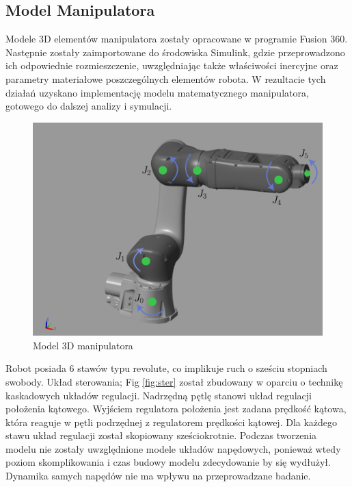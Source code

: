 \documentclass[journal,twoside,web]{ieeecolor}
\begin{document}
\subsection{Model Manipulatora}
Modele 3D elementów manipulatora zostały opracowane w programie Fusion 360. Następnie zostały zaimportowane do środowiska Simulink, gdzie przeprowadzono ich odpowiednie rozmieszczenie, uwzględniając także właściwości inercyjne oraz parametry materiałowe poszczególnych elementów robota. W rezultacie tych działań uzyskano implementację modelu matematycznego manipulatora, gotowego do dalszej analizy i symulacji. 
\begin{figure}[H]
	\centering
	\includegraphics[width=1\linewidth]{../figs/joints}
	\caption{Model 3D manipulatora}
	\label{fig:joints}
\end{figure}
Robot posiada 6 stawów typu revolute, co implikuje ruch o sześciu stopniach swobody. Układ sterowania; Fig \ref{fig:ster} został zbudowany w oparciu o technikę kaskadowych układów regulacji. Nadrzędną pętlę stanowi układ regulacji położenia kątowego. Wyjściem regulatora położenia jest zadana prędkość kątowa, która reaguje w pętli podrzędnej z regulatorem prędkości kątowej. Dla każdego stawu układ regulacji został skopiowany sześciokrotnie. Podczas tworzenia modelu nie zostały uwzględnione modele układów napędowych, ponieważ wtedy poziom skomplikowania i czas budowy modelu zdecydowanie by się wydłużył. Dynamika samych napędów nie ma wpływu na przeprowadzane badanie.
\end{document}
